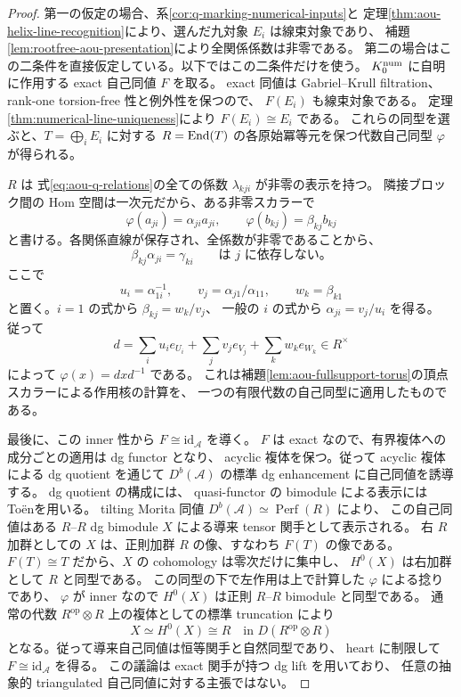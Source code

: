 \begin{proof}
第一の仮定の場合、系\ref{cor:q-marking-numerical-inputs}と
定理\ref{thm:aou-helix-line-recognition}により、選んだ九対象 $E_i$ は線束対象であり、
補題\ref{lem:rootfree-aou-presentation}により全関係係数は非零である。
第二の場合はこの二条件を直接仮定している。以下ではこの二条件だけを使う。
$K_0^{\rm num}$ に自明に作用する exact 自己同値 $F$ を取る。
exact 同値は Gabriel--Krull filtration、rank-one torsion-free 性と例外性を保つので、
$F(E_i)$ も線束対象である。
定理\ref{thm:numerical-line-uniqueness}により $F(E_i)\cong E_i$ である。
これらの同型を選ぶと、$T=\bigoplus_iE_i$ に対する
$R=\operatorname{End}(T)$ の各原始冪等元を保つ代数自己同型 $\varphi$ が得られる。

$R$ は
式\eqref{eq:aou-q-relations}の全ての係数 $\lambda_{kji}$ が非零の表示を持つ。
隣接ブロック間の Hom 空間は一次元だから、ある非零スカラーで
\[
 \varphi(a_{ji})=\alpha_{ji}a_{ji},\qquad
 \varphi(b_{kj})=\beta_{kj}b_{kj}
\]
と書ける。各関係直線が保存され、全係数が非零であることから、
\[
 \beta_{kj}\alpha_{ji}=\gamma_{ki}\qquad\text{は $j$ に依存しない。}
\]
ここで
\[
 u_i=\alpha_{1i}^{-1},\qquad
 v_j=\alpha_{j1}/\alpha_{11},\qquad w_k=\beta_{k1}
\]
と置く。$i=1$ の式から $\beta_{kj}=w_k/v_j$、
一般の $i$ の式から $\alpha_{ji}=v_j/u_i$ を得る。
従って
\[
 d=\sum_i u_i e_{U_i}+\sum_jv_j e_{V_j}+\sum_kw_k e_{W_k}\in R^\times
\]
によって $\varphi(x)=dxd^{-1}$ である。
これは補題\ref{lem:aou-fullsupport-torus}の頂点スカラーによる作用核の計算を、
一つの有限代数の自己同型に適用したものである。

最後に、この inner 性から $F\cong\mathrm{id}_{\mathcal A}$ を導く。
$F$ は exact なので、有界複体への成分ごとの適用は dg functor となり、
acyclic 複体を保つ。従って acyclic 複体による dg quotient を通じて
$D^b(\mathcal A)$ の標準 dg enhancement に自己同値を誘導する。
dg quotient の構成には\cite[\S4.4, Theorem 4.8]{KellerDG}、
quasi-functor の bimodule による表示には
To\"en\cite[Theorem 7.2(2), Corollary 7.6]{ToenMorita}を用いる。
tilting Morita 同値 $D^b(\mathcal A)\simeq\operatorname{Perf}(R)$ により、
この自己同値はある $R$--$R$ dg bimodule $X$ による導来 tensor 関手として表示される。
右 $R$ 加群としての $X$ は、正則加群 $R$ の像、すなわち $F(T)$ の像である。
$F(T)\cong T$ だから、$X$ の cohomology は零次だけに集中し、
$H^0(X)$ は右加群として $R$ と同型である。
この同型の下で左作用は上で計算した $\varphi$ による捻りであり、
$\varphi$ が inner なので $H^0(X)$ は正則 $R$--$R$ bimodule と同型である。
通常の代数 $R^{\mathrm{op}}\otimes R$ 上の複体としての標準 truncation により
\[
 X\simeq H^0(X)\cong R
 \quad\text{in }D(R^{\mathrm{op}}\otimes R)
\]
となる。従って導来自己同値は恒等関手と自然同型であり、
heart に制限して $F\cong\mathrm{id}_{\mathcal A}$ を得る。
この議論は exact 関手が持つ dg lift を用いており、
任意の抽象的 triangulated 自己同値に対する主張ではない。


\end{proof}
